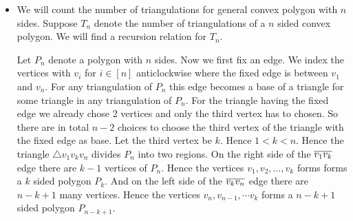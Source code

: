 \documentclass[a4paper, 11pt]{article}
\begin{document}
{\begin{itemize}[label=$\bullet$]
\begin{itemize}
Therefore any triangulation of a regular polygon with $n$ sides has $n-2$ triangles. 
\item 	We will count the number of triangulations for general convex polygon with $n$ sides. Suppose $T_n$ denote the number of triangulations of a $n$ sided convex polygon. We will find a recursion relation for $T_n$. 

\begin{adjustbox}{minipage={\linewidth}, valign=t}
	
	\begin{figure}
		
		\begin{center}
		\end{center}
	\end{figure}
\parinn

Let $P_n$ denote a polygon with $n$ sides. Now we first fix an edge. We index the vertices with $v_i$ for $i\in[n]$ anticlockwise where the fixed edge is between $v_1$ and $v_n$. For any triangulation of $P_n$ this edge becomes a base of a triangle for some triangle in any triangulation of $P_n$. For the triangle having the fixed edge we already chose 2 vertices and only the third vertex has to chosen. So there are in total $n-2$ choices to choose the third vertex of the triangle with the fixed edge as base. Let the third vertex be $k$. Hence $1<k<n$. Hence the triangle $\triangle v_1v_kv_n$ divides $P_n$ into two regions. On the right side of the $\overline{v_1v_k}$ edge there are $k-1$ vertices of $P_n$. Hence the vertices $v_1,v_2,\dots, v_k$ forms  forms a $k$ sided polygon $P_{k}$. And on the left side of the $\overline{v_kv_n}$ edge there are $n-k+1$ many vertices. Hence the vertices $v_n,v_{n-1},\cdots v_k$ forms a $n-k+1$ sided polygon $P_{n-k+1}$. 
\end{adjustbox}



\end{itemize}
\end{itemize}}
\end{document}
